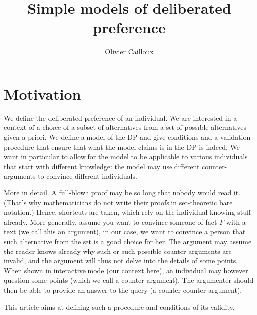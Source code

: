 \documentclass[version=last, pagesize, twoside=semi, DIV=calc, bibliography=totoc, 12pt, a4paper, french, english]{scrartcl}
\begin{document}
\title{Simple models of deliberated preference}
\author{Olivier Cailloux}
\makeatletter
\makeatother
\maketitle

\section{Motivation}
We define the deliberated preference of an individual. We are interested in a context of a choice of a subset of alternatives from a set of possible alternatives given a priori. We define a model of the DP and give conditions and a validation procedure that ensure that what the model claims is in the DP is indeed. We want in particular to allow for the model to be applicable to various individuals that start with different knowledge: the model may use different counter-arguments to convince different individuals.

More in detail. A full-blown proof may be so long that nobody would read it. (That’s why mathematicians do not write their proofs in set-theoretic bare notation.) Hence, shortcuts are taken, which rely on the individual knowing stuff already. More generally, assume you want to convince someone of fact $F$ with a text (we call this an argument), in our case, we want to convince a person that such alternative from the set is a good choice for her. The argument may assume the reader knows already why such or such possible counter-arguments are invalid, and the argument will thus not delve into the details of some points. When shown in interactive mode (our context here), an individual may however question some points (which we call a counter-argument). The argumenter should then be able to provide an answer to the query (a counter-counter-argument).

This article aims at defining such a procedure and conditions of its validity.
\end{document}
